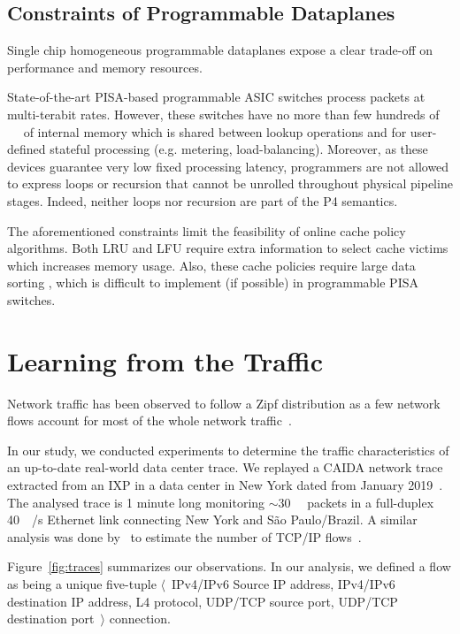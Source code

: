 \subsection{Constraints of Programmable Dataplanes}

Single chip homogeneous programmable dataplanes expose a clear trade-off on performance and memory resources.

State-of-the-art PISA-based programmable ASIC switches process packets at multi-terabit rates.
However, these switches have no more than few hundreds of \SI{}{\mega\byte} of internal memory which is shared between lookup operations and for user-defined stateful processing (e.g. metering, load-balancing).
Moreover, as these devices guarantee very low fixed processing latency, programmers are not allowed to express loops or recursion that cannot be unrolled throughout physical pipeline stages.
Indeed, neither loops nor recursion are part of the P4 semantics.

The aforementioned constraints limit the feasibility of online cache policy algorithms.
Both LRU and LFU require extra information to select cache victims which increases memory usage.
Also, these cache policies require large data sorting , which is difficult to implement (if possible) in programmable PISA switches.

\section{Learning from the Traffic}\label{sec:traffic}

Network traffic has been observed to follow a Zipf distribution as a few network flows account for most of the whole network traffic~\cite{Sarrar:2012,Jin:2017}.

In our study, we conducted experiments to determine the traffic characteristics of an up-to-date real-world data center trace.
We replayed a CAIDA network trace extracted from an IXP in a data center in New York dated from January 2019~\cite{caida:19}.
The analysed trace is 1 minute long monitoring $\sim$\SI{30}{\mega\nothing} packets in a full-duplex \SI{40}{\giga\bit/\second} Ethernet link connecting New York and S\~ao Paulo/Brazil.
A similar analysis was done by~\citeauthor{Spang:19} to estimate the number of TCP/IP flows~\cite{Spang:19}.

Figure~\ref{fig:traces} summarizes our observations.
In our analysis, we defined a flow as being a unique five-tuple $\langle$~IPv4/IPv6 Source IP address, IPv4/IPv6 destination IP address, L4 protocol, UDP/TCP source port, UDP/TCP destination port~$\rangle$ connection.

